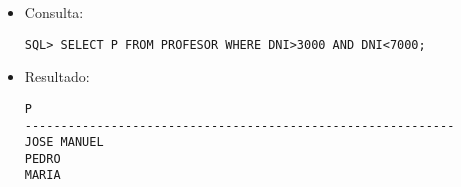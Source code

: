 \documentclass[11pt]{report}
\begin{document}
\begin{itemize}
  \item Consulta:
  \begin{verbatim}
SQL> SELECT P FROM PROFESOR WHERE DNI>3000 AND DNI<7000;
  \end{verbatim}
  \item{Resultado:}
  \begin{verbatim}
P                                                                                                                                                                                                                                                                                                                                                                                                                                                                                                                   
------------------------------------------------------------                                                                                                                                                                                                                                                                                                                                                                                                                                                        
JOSE MANUEL                                                                                                                                                                                                                                                                                                                                                                                                                                                                                                         
PEDRO                                                                                                                                                                                                                                                                                                                                                                                                                                                                                                               
MARIA                                                                                                                                                                                                                                                                                                                                                                                                                                                                                                               

\end{verbatim}
\end{itemize}
\end{document}
